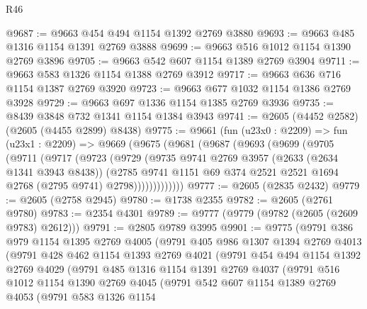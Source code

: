\begin{lexlean}{R46}
\begin{coremodule}
@9687 := @9663 @454 @494 @1154 @1392 @2769 @3880
@9693 := @9663 @485 @1316 @1154 @1391 @2769 @3888
@9699 := @9663 @516 @1012 @1154 @1390 @2769 @3896
@9705 := @9663 @542 @607 @1154 @1389 @2769 @3904
@9711 := @9663 @583 @1326 @1154 @1388 @2769 @3912
@9717 := @9663 @636 @716 @1154 @1387 @2769 @3920
@9723 := @9663 @677 @1032 @1154 @1386 @2769 @3928
@9729 := @9663 @697 @1336 @1154 @1385 @2769 @3936
@9735 := @8439 @3848 @732 @1341 @1154 @1384 @3943
@9741 := @2605 (@4452 @2582) (@2605 (@4455 @2899) @8438)
@9775 := @9661
    (fun (u23x0 : @2209) =>
    fun (u23x1 : @2209) =>
    @9669
      (@9675
        (@9681
          (@9687
            (@9693
              (@9699
                (@9705
                  (@9711
                    (@9717
                      (@9723
                        (@9729
                          (@9735
                            @9741
                            @2769
                            @3957
                            (@2633 (@2634 @1341 @3943 @8438))
                            (@2785
                              @9741
                              @1151
                              @69
                              @374
                              @2521
                              @2521
                              @1694
                              @2768
                              (@2795 @9741)
                              @2798)))))))))))))
@9777 := @2605 (@2835 @2432)
@9779 := @2605 (@2758 @2945)
@9780 := @1738 @2355
@9782 := @2605 (@2761 @9780)
@9783 := @2354 @4301
@9789 := @9777 (@9779 (@9782 (@2605 (@2609 @9783) @2612)))
@9791 := @2805 @9789 @3995
@9901 := @9775
    (@9791
      @386
      @979
      @1154
      @1395
      @2769
      @4005
      (@9791
        @405
        @986
        @1307
        @1394
        @2769
        @4013
        (@9791
          @428
          @462
          @1154
          @1393
          @2769
          @4021
          (@9791
            @454
            @494
            @1154
            @1392
            @2769
            @4029
            (@9791
              @485
              @1316
              @1154
              @1391
              @2769
              @4037
              (@9791
                @516
                @1012
                @1154
                @1390
                @2769
                @4045
                (@9791
                  @542
                  @607
                  @1154
                  @1389
                  @2769
                  @4053
                  (@9791
                    @583
                    @1326
                    @1154

\end{coremodule}
\end{lexlean}
